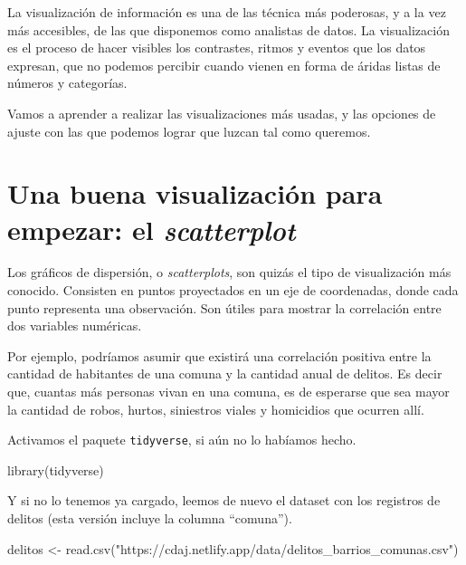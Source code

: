 \documentclass[
]{book}
\newenvironment{Shaded}{\begin{snugshade}}{\end{snugshade}}
\newcommand{\FunctionTok}[1]{\textcolor[rgb]{0.00,0.00,0.00}{#1}}
\newcommand{\NormalTok}[1]{#1}
\newcommand{\OtherTok}[1]{\textcolor[rgb]{0.56,0.35,0.01}{#1}}
\newcommand{\StringTok}[1]{\textcolor[rgb]{0.31,0.60,0.02}{#1}}
\begin{document}
La visualización de información es una de las técnica más poderosas, y a la vez más accesibles, de las que disponemos como analistas de datos. La visualización es el proceso de hacer visibles los contrastes, ritmos y eventos que los datos expresan, que no podemos percibir cuando vienen en forma de áridas listas de números y categorías.

Vamos a aprender a realizar las visualizaciones más usadas, y las opciones de ajuste con las que podemos lograr que luzcan tal como queremos.

\hypertarget{una-buena-visualizaciuxf3n-para-empezar-el-scatterplot}{%
\section{\texorpdfstring{Una buena visualización para empezar: el \emph{scatterplot}}{Una buena visualización para empezar: el scatterplot}}\label{una-buena-visualizaciuxf3n-para-empezar-el-scatterplot}}

Los gráficos de dispersión, o \emph{scatterplots}, son quizás el tipo de visualización más conocido. Consisten en puntos proyectados en un eje de coordenadas, donde cada punto representa una observación. Son útiles para mostrar la correlación entre dos variables numéricas.

Por ejemplo, podríamos asumir que existirá una correlación positiva entre la cantidad de habitantes de una comuna y la cantidad anual de delitos. Es decir que, cuantas más personas vivan en una comuna, es de esperarse que sea mayor la cantidad de robos, hurtos, siniestros viales y homicidios que ocurren allí.

Activamos el paquete \texttt{tidyverse}, si aún no lo habíamos hecho.

\begin{Shaded}
\begin{Highlighting}[]
\FunctionTok{library}\NormalTok{(tidyverse)}
\end{Highlighting}
\end{Shaded}

Y si no lo tenemos ya cargado, leemos de nuevo el dataset con los registros de delitos (esta versión incluye la columna ``comuna'').

\begin{Shaded}
\begin{Highlighting}[]
\NormalTok{delitos }\OtherTok{\textless{}{-}} \FunctionTok{read.csv}\NormalTok{(}\StringTok{"https://cdaj.netlify.app/data/delitos\_barrios\_comunas.csv"}\NormalTok{)}
\end{Highlighting}
\end{Shaded}
\end{document}
